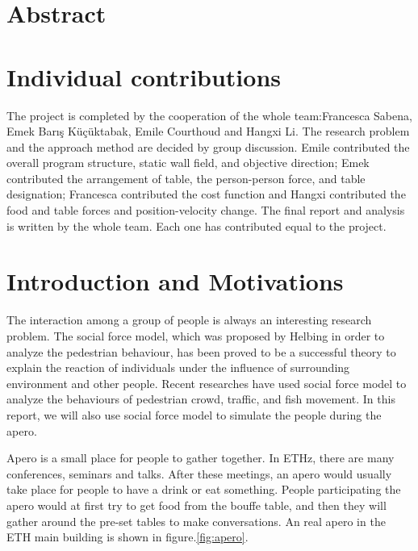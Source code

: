 \documentclass[11pt]{article}
\begin{document}



\section{Abstract}

\section{Individual contributions}

The project is completed by the cooperation of the whole team:Francesca Sabena, Emek Barış Küçüktabak, Emile Courthoud and Hangxi Li. The research problem and the approach method are decided by group discussion. Emile contributed the overall program structure, static wall field, and objective direction; Emek contributed the arrangement of table, the person-person force, and table designation; Francesca contributed the cost function and Hangxi contributed the food and table forces and position-velocity change. The final report and analysis is written by the whole team. Each one has contributed equal to the project.

\section{Introduction and Motivations}
The interaction among a group of people is always an interesting research problem. The social force model, which was proposed by Helbing\cite{Socialforce,ModificationSocialforce} in order to analyze the pedestrian behaviour, has been proved to be a successful theory to explain the reaction of individuals under the influence of surrounding environment and other people. Recent researches have used social force model to analyze the behaviours of pedestrian crowd\cite{crowd1,crowd2,crowd3,traffic3crowd4}, traffic\cite{traffic1,traffic2,traffic3crowd4}, and fish movement\cite{fish}. In this report, we will also use social force model to simulate the people during the apero. 

Apero is a small place for people to gather together. In ETHz, there are many conferences, seminars and talks. After these meetings, an apero would usually take place for people to have a drink or eat something. People participating the apero would at first try to get food from the bouffe table, and then they will gather around the pre-set tables to make conversations. An real apero in the ETH main building is shown in figure.\ref{fig:apero}.
\end{document}
